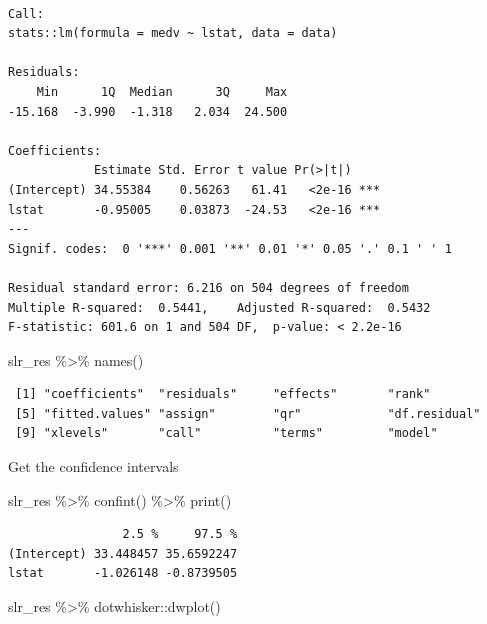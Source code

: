\documentclass[
  letterpaper,
  DIV=11,
  numbers=noendperiod]{scrreprt}
\newenvironment{Shaded}{\begin{snugshade}}{\end{snugshade}}
\newcommand{\FunctionTok}[1]{\textcolor[rgb]{0.02,0.16,0.49}{#1}}
\newcommand{\NormalTok}[1]{\textcolor[rgb]{0.33,0.33,0.33}{#1}}
\newcommand{\SpecialCharTok}[1]{\textcolor[rgb]{0.00,0.46,0.62}{#1}}
\begin{document}
\begin{verbatim}

Call:
stats::lm(formula = medv ~ lstat, data = data)

Residuals:
    Min      1Q  Median      3Q     Max 
-15.168  -3.990  -1.318   2.034  24.500 

Coefficients:
            Estimate Std. Error t value Pr(>|t|)    
(Intercept) 34.55384    0.56263   61.41   <2e-16 ***
lstat       -0.95005    0.03873  -24.53   <2e-16 ***
---
Signif. codes:  0 '***' 0.001 '**' 0.01 '*' 0.05 '.' 0.1 ' ' 1

Residual standard error: 6.216 on 504 degrees of freedom
Multiple R-squared:  0.5441,    Adjusted R-squared:  0.5432 
F-statistic: 601.6 on 1 and 504 DF,  p-value: < 2.2e-16
\end{verbatim}

\begin{Shaded}
\begin{Highlighting}[]
\NormalTok{slr\_res }\SpecialCharTok{\%\textgreater{}\%} \FunctionTok{names}\NormalTok{()}
\end{Highlighting}
\end{Shaded}

\begin{verbatim}
 [1] "coefficients"  "residuals"     "effects"       "rank"         
 [5] "fitted.values" "assign"        "qr"            "df.residual"  
 [9] "xlevels"       "call"          "terms"         "model"        
\end{verbatim}

Get the confidence intervals

\begin{Shaded}
\begin{Highlighting}[]
\NormalTok{slr\_res }\SpecialCharTok{\%\textgreater{}\%} \FunctionTok{confint}\NormalTok{() }\SpecialCharTok{\%\textgreater{}\%} \FunctionTok{print}\NormalTok{()}
\end{Highlighting}
\end{Shaded}

\begin{verbatim}
                2.5 %     97.5 %
(Intercept) 33.448457 35.6592247
lstat       -1.026148 -0.8739505
\end{verbatim}

\begin{Shaded}
\begin{Highlighting}[]
\NormalTok{slr\_res }\SpecialCharTok{\%\textgreater{}\%}\NormalTok{ dotwhisker}\SpecialCharTok{::}\FunctionTok{dwplot}\NormalTok{()}
\end{Highlighting}
\end{Shaded}
\end{document}
